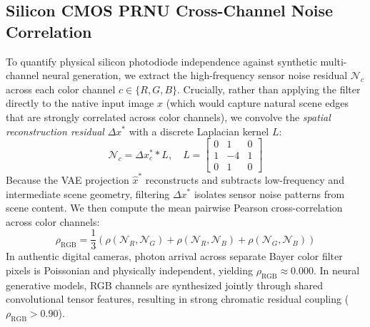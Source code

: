 \documentclass[11pt]{article}
\theoremstyle{definition}
\begin{document}
\subsection{Silicon CMOS PRNU Cross-Channel Noise Correlation}
To quantify physical silicon photodiode independence against synthetic multi-channel neural generation, we extract the high-frequency sensor noise residual $\mathcal{N}_c$ across each color channel $c \in \{R, G, B\}$. Crucially, rather than applying the filter directly to the native input image $x$ (which would capture natural scene edges that are strongly correlated across color channels), we convolve the \textit{spatial reconstruction residual} $\Delta x^*$ with a discrete Laplacian kernel $L$:
\begin{equation}
\mathcal{N}_c = \Delta x^*_c * L, \quad L = \begin{bmatrix} 0 & 1 & 0 \\ 1 & -4 & 1 \\ 0 & 1 & 0 \end{bmatrix}
\end{equation}
Because the VAE projection $\hat{x}^*$ reconstructs and subtracts low-frequency and intermediate scene geometry, filtering $\Delta x^*$ isolates sensor noise patterns from scene content. We then compute the mean pairwise Pearson cross-correlation across color channels:
\begin{equation}
\rho_{\text{RGB}} = \frac{1}{3} \left( \rho(\mathcal{N}_R, \mathcal{N}_G) + \rho(\mathcal{N}_R, \mathcal{N}_B) + \rho(\mathcal{N}_G, \mathcal{N}_B) \right)
\end{equation}
In authentic digital cameras, photon arrival across separate Bayer color filter pixels is Poissonian and physically independent, yielding $\rho_{\text{RGB}} \approx 0.000$. In neural generative models, RGB channels are synthesized jointly through shared convolutional tensor features, resulting in strong chromatic residual coupling ($\rho_{\text{RGB}} > 0.90$).
\end{document}
